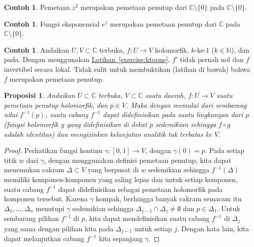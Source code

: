 \documentclass[12pt,openany]{book}
\newcommand{\C}{{\mathbb{C}}}
\newcommand{\N}{{\mathbb{N}}}
\theoremstyle{plain}
\newtheorem{prop}[thm]{Proposisi}
\theoremstyle{remark}
\theoremstyle{definition}
\theoremstyle{exercise}
\theoremstyle{example}
\newtheorem{example}[thm]{Contoh}
\newcommand{\exerciseref}[1]{\hyperref[#1]{Latihan~\ref*{#1}}}
\begin{document}
\begin{example}
Pemetaan $z^2$ merupakan pemetaan penutup dari $\C \setminus \{ 0 \}$ pada $\C \setminus \{ 0 \}$.
\end{example}

\begin{example}
Fungsi eksponensial $e^z$ merupakan pemetaan penutup dari $\C$ pada $\C \setminus \{ 0 \}$.
\end{example}

\begin{example}
Andaikan $U,V \subset \C$ terbuka, $f \colon U \to V$ holomorfik, $k$-ke-1
($k \in \N$), dan pada.
Dengan menggunakan \exerciseref{exercise:ktoone}, $f'$ tidak pernah nol dan
$f$ invertibel secara lokal.  Tidak sulit untuk
membuktikan (latihan di bawah) bahwa $f$ merupakan pemetaan penutup.
\end{example}

\begin{prop}
Andaikan $U \subset \C$ terbuka, $V \subset \C$ suatu daerah,
$f \colon U \to V$ suatu pemetaan penutup holomorfik, dan $p \in V$.
Maka dengan memulai dari sembarang nilai $f^{-1}(p)$, suatu cabang $f^{-1}$
dapat didefinisikan pada suatu lingkungan
dari $p$ (fungsi holomorfik $g$ yang didefinisikan di dekat $p$ sedemikian sehingga $f \circ g$ adalah
identitas) dan mengizinkan kelanjutan analitik tak terbatas ke $V$.
\end{prop}

\begin{proof}
Perhatikan fungsi kontinu $\gamma \colon [0,1] \to V$, dengan $\gamma(0) = p$.
Pada setiap titik $w$ dari $\gamma$, dengan menggunakan definisi pemetaan penutup,
kita dapat menemukan cakram $\Delta \subset V$ yang berpusat di $w$ sedemikian sehingga
$f^{-1}(\Delta)$ memiliki 
komponen-komponen yang saling lepas dan untuk setiap komponen, suatu cabang $f^{-1}$ dapat didefinisikan sebagai
pemetaan holomorfik pada komponen tersebut.  Karena $\gamma$ kompak, berhingga banyak
cakram semacam itu $\Delta_1,\ldots,\Delta_n$ menutupi $\gamma$ sedemikian sehingga $\Delta_{j-1}
\cap \Delta_j \neq \emptyset$ dan $p \in \Delta_1$.  Untuk sembarang pilihan
$f^{-1}$ di $p$, kita dapat mendefinisikan suatu cabang $f^{-1}$ di $\Delta_j$
yang sama dengan
pilihan kita pada $\Delta_{j-1}$ untuk setiap $j$.  Dengan kata lain, kita dapat
melanjutkan cabang $f^{-1}$ kita
sepanjang $\gamma$.
\end{proof}
\end{document}
